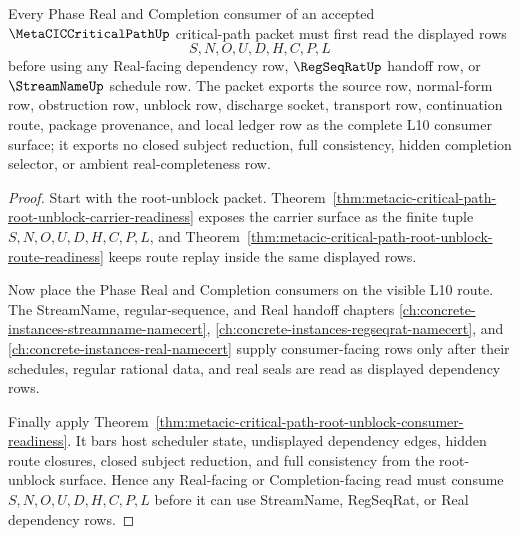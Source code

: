 \begin{theorem}
\label{thm:metacic-critical-path-phase-real-route-budget}
Every Phase Real and Completion consumer of an accepted $\MetaCICCriticalPathUp$ critical-path packet must first read the displayed rows
$$
S,N,O,U,D,H,C,P,L
$$
before using any Real-facing dependency row, $\RegSeqRatUp$ handoff row, or $\StreamNameUp$ schedule row. The packet exports the source row, normal-form row, obstruction row, unblock row, discharge socket, transport row, continuation route, package provenance, and local ledger row as the complete L10 consumer surface; it exports no closed subject reduction, full consistency, hidden completion selector, or ambient real-completeness row.
\end{theorem}
\begin{proof}
Start with the root-unblock packet. Theorem~\ref{thm:metacic-critical-path-root-unblock-carrier-readiness} exposes the carrier surface as the finite tuple $S,N,O,U,D,H,C,P,L$, and Theorem~\ref{thm:metacic-critical-path-root-unblock-route-readiness} keeps route replay inside the same displayed rows.

Now place the Phase Real and Completion consumers on the visible L10 route. The StreamName, regular-sequence, and Real handoff chapters \autoref{ch:concrete-instances-streamname-namecert}, \autoref{ch:concrete-instances-regseqrat-namecert}, and \autoref{ch:concrete-instances-real-namecert} supply consumer-facing rows only after their schedules, regular rational data, and real seals are read as displayed dependency rows.

Finally apply Theorem~\ref{thm:metacic-critical-path-root-unblock-consumer-readiness}. It bars host scheduler state, undisplayed dependency edges, hidden route closures, closed subject reduction, and full consistency from the root-unblock surface. Hence any Real-facing or Completion-facing read must consume $S,N,O,U,D,H,C,P,L$ before it can use StreamName, RegSeqRat, or Real dependency rows.
\end{proof}

